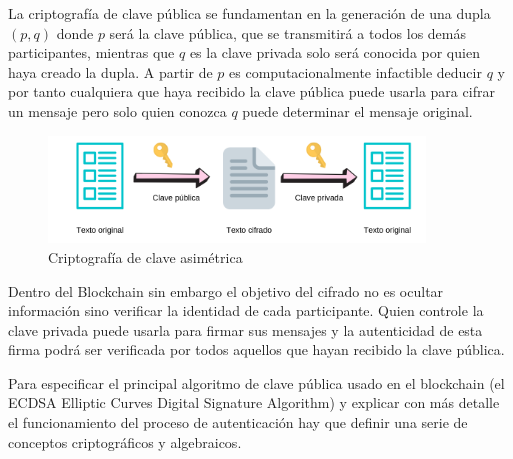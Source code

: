 La criptografía de clave pública se fundamentan en la generación de una dupla $(p,q)$ donde $p$ será la clave pública, que se transmitirá a todos los demás participantes, mientras que $q$ es la clave privada solo será conocida por quien haya creado la dupla. A partir de $p$ es computacionalmente infactible deducir $q$ y por tanto cualquiera que haya recibido la clave pública puede usarla para cifrar un mensaje pero solo quien conozca $q$ puede determinar el mensaje original.

\begin{figure}[H]\label{fig:cripto_asimetric}

  \begin{center}
  \includegraphics[width=10cm]{figures/asimetrica.png}
  \end{center}
  \caption{Criptografía de clave asimétrica}

\end{figure} 
Dentro del Blockchain sin embargo el objetivo del cifrado no es ocultar información sino verificar la identidad de cada participante. Quien controle la clave privada puede usarla para firmar sus mensajes y la autenticidad de esta firma podrá ser verificada por todos aquellos que hayan recibido la clave pública. \citep{elliptic_cripto}

Para especificar el principal algoritmo de clave pública usado en el blockchain (el ECDSA Elliptic Curves Digital Signature Algorithm)\citep{elliptic_cripto} y explicar con más detalle el funcionamiento del proceso de autenticación hay que definir una serie de conceptos criptográficos y algebraicos. 
